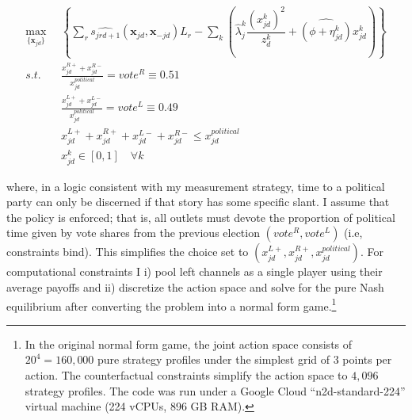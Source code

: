 \documentclass[12pt]{article}
\begin{document}
\begin{equation}\label{eq:payoffs2}
	\begin{aligned}
		\max_{\{\bm{x}_{jd}\}}   & \left\{   \sum_{r}\widehat{s_{jrd+1}}(\bm{x}_{jd}, \bm{x}_{-jd})L_r - \sum_k \left({\hat{\lambda}_j^k}  \dfrac{(x_{jd}^k)^2}{z_{d}^k} + \widehat{\left(\phi+{\eta}_{jd}^k\right)} x_{jd}^k \right)  \right\}\\
		s.t.   \quad &   \frac{x_{jd}^{R+} + x_{jd}^{R-} }{x_{jd}^{political}}=vote^R\equiv0.51\\
		&  \frac{x_{jd}^{L+} + x_{jd}^{L-} }{x_{jd}^{political}}= vote^L\equiv0.49\\
       &  x_{jd}^{L+} +x_{jd}^{R+} + x_{jd}^{L-} + x_{jd}^{R-} \leq  x_{jd}^{political}\\
		& x_{jd}^k \in [0,1] \quad \forall k
	\end{aligned}
\end{equation} 


where, in a logic consistent with my measurement strategy, time to a political party can only be discerned if that story has some specific slant. I assume that the policy is enforced; that is, all outlets must devote the proportion of political time given by vote shares from the previous election $(vote^R, vote^L)$ (i.e, constraints bind). This simplifies the choice set to $\left( x_{jd}^{L+} ,x_{jd}^{R+} ,x_{jd}^{political}\right)$. For computational constraints I i) pool left channels as a single player using their average payoffs and ii) discretize the action space and solve for the pure Nash equilibrium after converting the problem into a normal form game.\footnote{ In the original normal form game, the joint action space consists of 	$20^4=160,000$  pure strategy profiles under the simplest grid of 3 points per action. The counterfactual constraints simplify the action space to $4,096$ strategy profiles.  The code was run under a Google Cloud “n2d-standard-224” virtual machine (224 vCPUs, 896 GB RAM).} 



\end{document}
